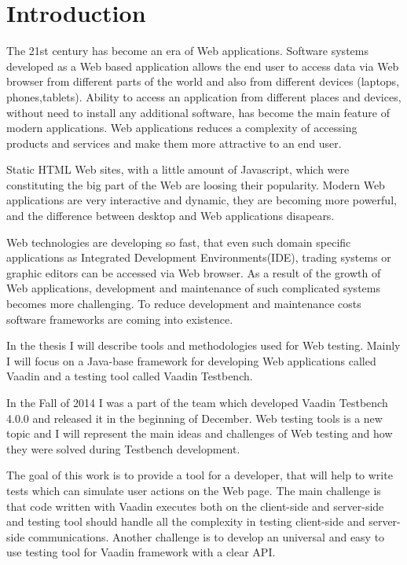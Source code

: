 	
	 \chapter{Introduction}
	 \label{ch:intro} 		
	The 21st century has become an era of Web applications. Software systems
	developed as a Web based application allows the end user to access data via
	Web browser from different parts of the world and also from different devices
	(laptops, phones,tablets). Ability to access an application from different places and
	devices, without need to install any additional software,
	has become the main feature of modern applications. Web applications reduces a
	complexity of accessing products and services and make them more attractive to an end
	user.
	
	Static HTML Web sites, with a little amount of Javascript, which
	were constituting the big part of the Web are loosing their popularity.
	Modern Web	applications are very interactive and dynamic, they are becoming
	more powerful, and the difference between desktop and Web applications
	disapears. 
	
	Web technologies are developing so fast, that even such domain
	specific applications as Integrated Development Environments(IDE), trading
	systems or graphic editors can be accessed via Web browser. As a result of the
	growth of Web applications, development and maintenance of such complicated
	systems becomes more challenging. To reduce development and maintenance costs
	software frameworks are coming into existence.
	
	In the thesis I will describe tools and methodologies used for Web testing.
	Mainly I will focus on a Java-base framework for developing Web applications called Vaadin and a testing tool
	called Vaadin Testbench.
	
	 In the Fall of 2014 I was a part of the team which developed Vaadin Testbench
	 4.0.0 and released it in the beginning of December. Web testing tools is a
	 new topic and I will represent the main ideas and challenges
	 of Web testing and how they were solved during Testbench development.
	 
	 The goal of this work is to provide a tool for a developer, that will help to
	 write tests which can simulate user actions on the Web page. The main
	 challenge is that code written with Vaadin executes both on the
	 client-side and server-side and testing tool should handle all the complexity
	 in testing client-side and server-side communications. Another challenge is to
	 develop an universal and easy to use testing tool for Vaadin framework with a
	 clear API.
	 
